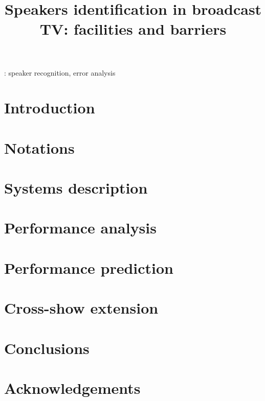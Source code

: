 \documentclass[a4paper]{article}
\title{Speakers identification in broadcast TV: facilities and barriers}
\begin{document}
\maketitle

\begin{abstract}

\end{abstract}

: speaker recognition, error analysis


\section{Introduction}
\label{sec:introduction}


\section{Notations}
\label{sec:notations}


\section{Systems description}
\label{sec:systems}


\section{Performance analysis}
\label{sec:analysis}


\section{Performance prediction}
\label{sec:prediction}


\section{Cross-show extension}
\label{sec:xshow}


\section{Conclusions}
\label{sec:conclusion}


\section{Acknowledgements}


\newpage
\eightpt



\end{document}
